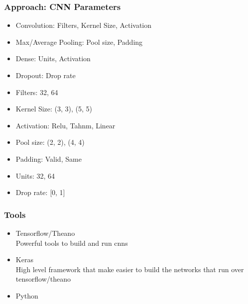 \documentclass[aspectratio=169]{beamer}
\begin{document}
		\begin{frame}
			\frametitle{Approach: CNN Parameters}
			
			\begin{itemize}
				\item Convolution: Filters, Kernel Size, Activation
				\item Max/Average Pooling: Pool size, Padding
				\item Dense: Units, Activation
				\item Dropout: Drop rate
				\item Filters: 32, 64
				\item Kernel Size: (3, 3), (5, 5)
				\item Activation: Relu, Tahnm, Linear
				\item Pool size: (2, 2), (4, 4)
				\item Padding: Valid, Same
				\item Units: 32, 64
				\item Drop rate: [0, 1]
			\end{itemize}
		
		\end{frame}
		\begin{frame}
			\frametitle{Tools}
			\begin{itemize}
				\item Tensorflow/Theano\\
					\textcolor{ExecusharesGrey}{\small\hspace{1em}Powerful tools to build and run cnns}
				\item Keras\\
					\textcolor{ExecusharesGrey}{\small\hspace{1em}High level framework that make easier to build the networks that run over tensorflow/theano}
				\item Python
			\end{itemize}
		\end{frame}
\end{document}
